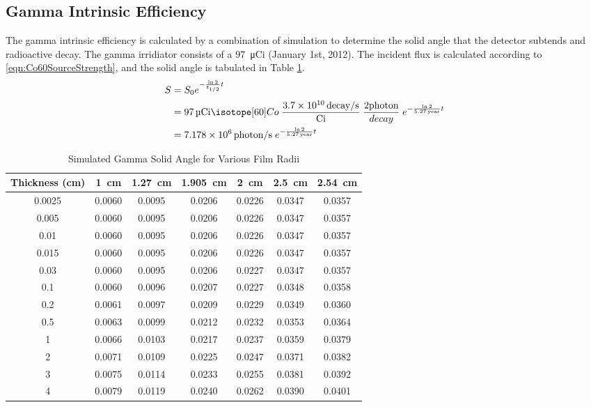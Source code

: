 \documentclass[draftcls,onecolumn]{IEEEtran}
\begin{document}
\subsection{Gamma Intrinsic Efficiency}
The gamma intrinsic efficiency is calculated by a combination of simulation to determine the solid angle that the detector subtends and radioactive decay.
The gamma irridiator consists of a \SI{97}{\micro Ci}  (January 1st, 2012).
The incident flux is calculated according to \eqref{eqn:Co60SourceStrength}, and the solid angle is tabulated in Table \ref{tab:GammaSolidAngle}.
\begin{align}
  \label{eqn:Co60SourceStrength}
  S &= S_0 e^{-\frac{\ln{2}}{t_{1/2}} t} \\ \notag 
    &= \SI{97}{\micro Ci} \iso[60]{Co}\; \frac{\SI{3.7E10}{decay\per\second}}{\si{Ci}} \;\frac{2\text{photon}}{decay}\;e^{-\frac{ \ln{2}}{\SI{5.27}{year}}t}  \\ \notag
    &= \SI{7.178E6}{photon\per\second}\;e^{-\frac{ \ln{2}}{\SI{5.27}{year}}t} 
\end{align}
\begin{table}
	\centering
	\caption{Simulated Gamma Solid Angle for Various Film Radii}
	\label{tab:GammaSolidAngle}
	\begin{tabular}{c | c c c c c c}
Thickness (\si{\cm})	&	\SI{1}{\cm}	&	\SI{1.27}{\cm}	&	\SI{1.905}{\cm}	&	\SI{2}{\cm}	&	\SI{2.5}{\cm}	&	\SI{2.54}{\cm} \\ \hline
0.0025	&	0.0060	&	0.0095	&	0.0206	&	0.0226	&	0.0347	&	0.0357\\
0.005	&	0.0060	&	0.0095	&	0.0206	&	0.0226	&	0.0347	&	0.0357\\
0.01	&	0.0060	&	0.0095	&	0.0206	&	0.0226	&	0.0347	&	0.0357\\
0.015	&	0.0060	&	0.0095	&	0.0206	&	0.0226	&	0.0347	&	0.0357\\
0.03	&	0.0060	&	0.0095	&	0.0206	&	0.0227	&	0.0347	&	0.0357\\
0.1	&	0.0060	&	0.0096	&	0.0207	&	0.0227	&	0.0348	&	0.0358\\
0.2	&	0.0061	&	0.0097	&	0.0209	&	0.0229	&	0.0349	&	0.0360\\
0.5	&	0.0063	&	0.0099	&	0.0212	&	0.0232	&	0.0353	&	0.0364\\
1	&	0.0066	&	0.0103	&	0.0217	&	0.0237	&	0.0359	&	0.0379\\
2	&	0.0071	&	0.0109	&	0.0225	&	0.0247	&	0.0371	&	0.0382\\
3	&	0.0075	&	0.0114	&	0.0233	&	0.0255	&	0.0381	&	0.0392\\
4	&	0.0079	&	0.0119	&	0.0240	&	0.0262	&	0.0390	&	0.0401\\
	\end{tabular}
\end{table}
\end{document}
